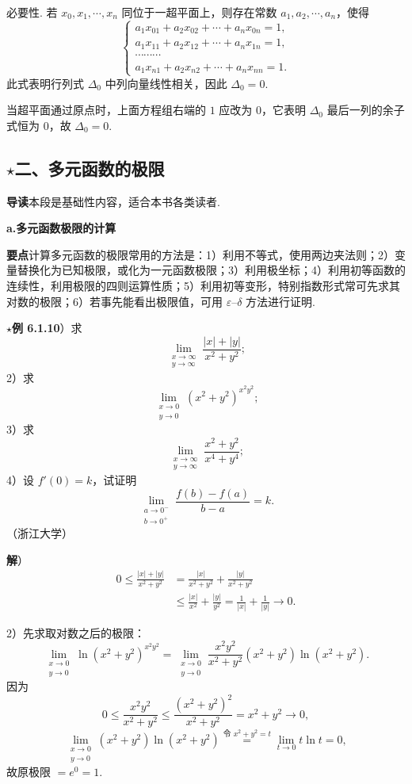 \documentclass[UTF8,12pt,a4paper,fontset=fandol]{ctexart}
\begin{document}
必要性. 若 $x_0,x_1,\cdots,x_n$ 同位于一超平面上，则存在常数 $a_1,a_2,\cdots,a_n$，使得
\[
\begin{cases}
a_1x_{01}+a_2x_{02}+\cdots+a_nx_{0n}=1,\\
a_1x_{11}+a_2x_{12}+\cdots+a_nx_{1n}=1,\\
\cdots\cdots\cdots\\
a_1x_{n1}+a_2x_{n2}+\cdots+a_nx_{nn}=1.
\end{cases}
\]
此式表明行列式 $\Delta_0$ 中列向量线性相关，因此 $\Delta_0=0$.

当超平面通过原点时，上面方程组右端的 $1$ 应改为 $0$，它表明 $\Delta_0$ 最后一列的余子式恒为 $0$，故 $\Delta_0=0$.

\subsection*{$\star$二、多元函数的极限}

\noindent\textbf{导读}\quad 本段是基础性内容，适合本书各类读者.

\noindent\textbf{a.\quad 多元函数极限的计算}

\noindent\textbf{要点}\quad 计算多元函数的极限常用的方法是：1）利用不等式，使用两边夹法则；2）变量替换化为已知极限，或化为一元函数极限；3）利用极坐标；4）利用初等函数的连续性，利用极限的四则运算性质；5）利用初等变形，特别指数形式常可先求其对数的极限；6）若事先能看出极限值，可用 $\varepsilon$--$\delta$ 方法进行证明.

\noindent\textbf{$\star$例 6.1.10}）求
\[
  \lim_{\substack{x\to\infty\\ y\to\infty}}\frac{|x|+|y|}{x^2+y^2};
\]
2）求
\[
  \lim_{\substack{x\to0\\ y\to0}}(x^2+y^2)^{x^2y^2};
\]
3）求
\[
  \lim_{\substack{x\to\infty\\ y\to\infty}}\frac{x^2+y^2}{x^4+y^4};
\]
4）设 $f'(0)=k$，试证明
\[
  \lim_{\substack{a\to0^-\\ b\to0^+}}\frac{f(b)-f(a)}{b-a}=k.
\]
（浙江大学）

\noindent\textbf{解}）
\[
\begin{aligned}
0\le \frac{|x|+|y|}{x^2+y^2}
&=\frac{|x|}{x^2+y^2}+\frac{|y|}{x^2+y^2}\\
&\le \frac{|x|}{x^2}+\frac{|y|}{y^2}
=\frac1{|x|}+\frac1{|y|}\to0.
\end{aligned}
\]

2）先求取对数之后的极限：
\[
  \lim_{\substack{x\to0\\ y\to0}}\ln(x^2+y^2)^{x^2y^2}
  =\lim_{\substack{x\to0\\ y\to0}}
  \frac{x^2y^2}{x^2+y^2}(x^2+y^2)\ln(x^2+y^2).
\]
因为
\[
  0\le\frac{x^2y^2}{x^2+y^2}
  \le\frac{(x^2+y^2)^2}{x^2+y^2}
  =x^2+y^2\to0,
\]
\[
  \lim_{\substack{x\to0\\ y\to0}}(x^2+y^2)\ln(x^2+y^2)
  \stackrel{\text{令 }x^2+y^2=t}{=}
  \lim_{t\to0}t\ln t=0,
\]
故原极限 $=e^0=1$.
\end{document}
